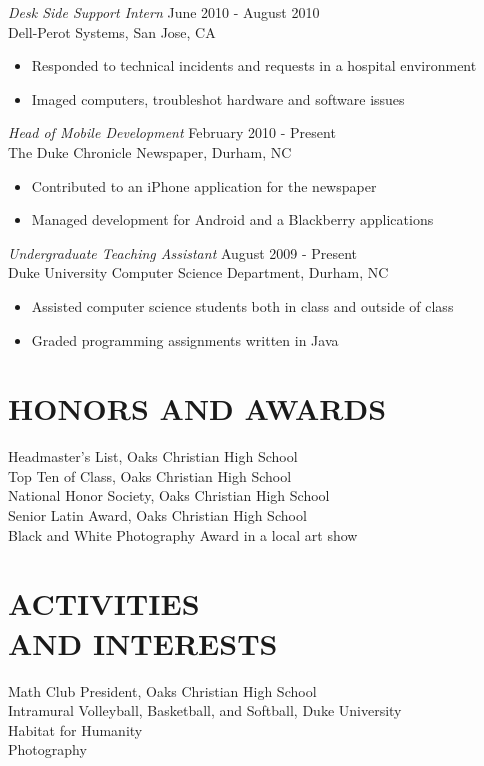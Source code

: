 \documentclass[line,margin]{res}
\begin{document}
\begin{resume}
	{\sl Desk Side Support Intern} \hfill June 2010 - August 2010 \\
                Dell-Perot Systems, San Jose, CA
                 \begin{itemize}  \itemsep -2pt %
                 \item Responded to technical incidents and requests in a hospital environment
		 \item Imaged computers, troubleshot hardware and software issues
                \end{itemize}

	{\sl Head of Mobile Development} \hfill February 2010 - Present \\
                The Duke Chronicle Newspaper, Durham, NC
                 \begin{itemize}  \itemsep -2pt %
                 \item Contributed to an iPhone application for the newspaper
				 \item Managed development for Android and a Blackberry applications
                \end{itemize}

				{\sl Undergraduate Teaching Assistant} \hfill August 2009 - Present \\
                Duke University Computer Science Department, 
                Durham, NC
                 \begin{itemize}  \itemsep -2pt %
                 \item Assisted computer science students both in class and outside of class
				 \item Graded programming assignments written in Java
                \end{itemize}
                

\section{HONORS AND AWARDS}
	Headmaster's List, Oaks Christian High School \\
	Top Ten of Class, Oaks Christian High School \\
	National Honor Society, Oaks Christian High School \\
	Senior Latin Award, Oaks Christian High School \\
	Black and White Photography Award in a local art show

\section{ACTIVITIES \\ AND INTERESTS}             
 			Math Club President, Oaks Christian High School \\
			Intramural Volleyball, Basketball, and Softball, Duke University \\
			Habitat for Humanity \\
			Photography
\end{resume}
\end{document}
